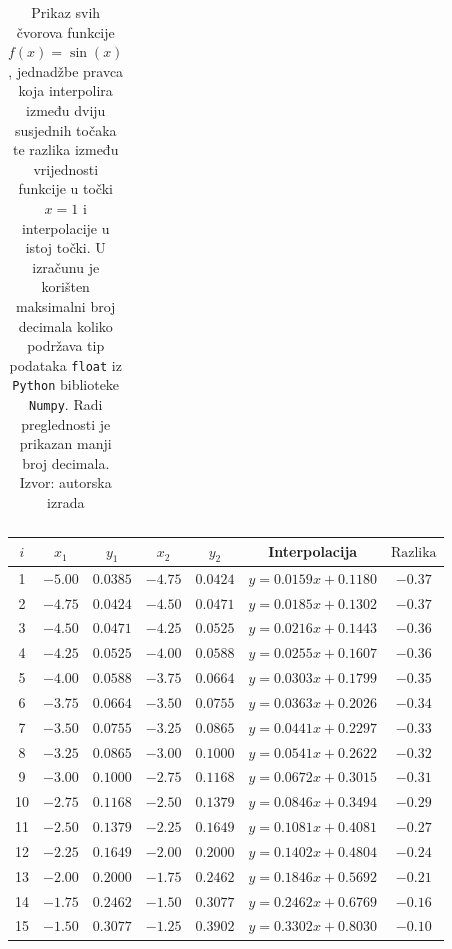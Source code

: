 \documentclass[12pt,a4paper]{report}
\begin{document}
\begin{table}
\begin{center}
\begin{tabular}{c | c c | c c | c | c}
			
			
		\end{tabular}
	\end{center}
	\caption{
		Prikaz svih čvorova funkcije $f(x)=\sin(x)$, jednadžbe pravca koja interpolira između dviju susjednih točaka te razlika između vrijednosti funkcije u točki $x=1$ i interpolacije u istoj točki. U izračunu je korišten maksimalni broj decimala koliko podržava tip podataka \texttt{float} iz \texttt{Python} biblioteke \texttt{Numpy}. Radi preglednosti je prikazan manji broj decimala. Izvor: autorska izrada}
	\label{linInterpolTablica}
\end{table}
\begin{table}
	\begin{center}
		\begin{tabular}{c | cc|cc|c|c}
			$i$&$x_1$&$y_1$&$x_2$&$y_2$&Interpolacija&$\text{Razlika}$\\\hline
			1 &$-5.00$&$0.0385$&$-4.75$&$0.0424$&$y =  0.0159x+0.1180$&$-0.37$\\
			2 &$-4.75$&$0.0424$&$-4.50$&$0.0471$&$y =  0.0185x+0.1302$&$-0.37$\\
			3 &$-4.50$&$0.0471$&$-4.25$&$0.0525$&$y =  0.0216x+0.1443$&$-0.36$\\
			4 &$-4.25$&$0.0525$&$-4.00$&$0.0588$&$y =  0.0255x+0.1607$&$-0.36$\\
			5 &$-4.00$&$0.0588$&$-3.75$&$0.0664$&$y =  0.0303x+0.1799$&$-0.35$\\
			6 &$-3.75$&$0.0664$&$-3.50$&$0.0755$&$y =  0.0363x+0.2026$&$-0.34$\\
			7 &$-3.50$&$0.0755$&$-3.25$&$0.0865$&$y =  0.0441x+0.2297$&$-0.33$\\
			8 &$-3.25$&$0.0865$&$-3.00$&$0.1000$&$y =  0.0541x+0.2622$&$-0.32$\\
			9 &$-3.00$&$0.1000$&$-2.75$&$0.1168$&$y =  0.0672x+0.3015$&$-0.31$\\
			10 &$-2.75$&$0.1168$&$-2.50$&$0.1379$&$y =  0.0846x+0.3494$&$-0.29$\\
			11 &$-2.50$&$0.1379$&$-2.25$&$0.1649$&$y =  0.1081x+0.4081$&$-0.27$\\
			12 &$-2.25$&$0.1649$&$-2.00$&$0.2000$&$y =  0.1402x+0.4804$&$-0.24$\\
			13 &$-2.00$&$0.2000$&$-1.75$&$0.2462$&$y =  0.1846x+0.5692$&$-0.21$\\
			14 &$-1.75$&$0.2462$&$-1.50$&$0.3077$&$y =  0.2462x+0.6769$&$-0.16$\\
			15 &$-1.50$&$0.3077$&$-1.25$&$0.3902$&$y =  0.3302x+0.8030$&$-0.10$\\

\end{tabular}
\end{center}
\end{table}
\end{document}
